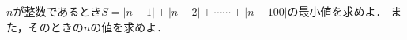 \documentclass[../../main.tex]{subfiles}
\begin{document}
$n$が整数であるとき$S=|n-1|+|n-2|+\cdots\cdots+|n-100|$の最小値を求めよ．
また，そのときの$n$の値を求めよ．
\end{document}
